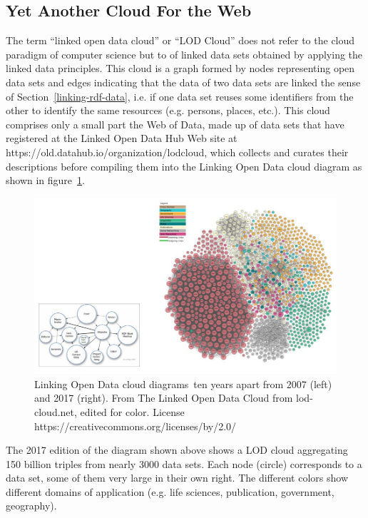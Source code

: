 \hypertarget{yet-another-cloud-for-the-web}{%
\subsection{Yet Another Cloud For the
Web}\label{yet-another-cloud-for-the-web}}

The term ``linked open data cloud'' or ``LOD Cloud'' does not refer to
the cloud paradigm of computer science but to of linked data sets
obtained by applying the linked data principles. This cloud is a graph
formed by nodes representing open data sets and edges indicating that the
data of two data sets are linked  the sense of Section~\ref{linking-rdf-data}, i.e. if one data set reuses some
identifiers from the other to identify the same resources (e.g.
persons, places, etc.). This cloud comprises only a small part the Web
of Data, made up of data sets that have registered at the Linked Open Data
Hub Web site at https://old.datahub.io/organization/lodcloud, 
which collects and curates their descriptions before
compiling them into the Linking Open Data cloud diagram as shown in
figure~\ref{fig:ch5.14}.

\begin{figure}
\includegraphics[width=5.0in]{media/ch5/figure-05-14.jpg}
\caption{\label{fig:ch5.14}Linking Open Data cloud diagrams\protect\footnotemark\ ten years apart from 2007 (left) and 2017 (right).  From The Linked Open Data Cloud from lod-cloud.net, edited for color.  License https://creativecommons.org/licenses/by/2.0/}
\end{figure}
\cite{lodcloudnet}

The 2017 edition of the diagram shown above shows a LOD cloud
aggregating 150 billion triples from nearly 3000 data sets. Each node
(circle) corresponds to a data set, some of them very large in their own
right. The different colors show different domains of application (e.g.
life sciences, publication, government, geography).

